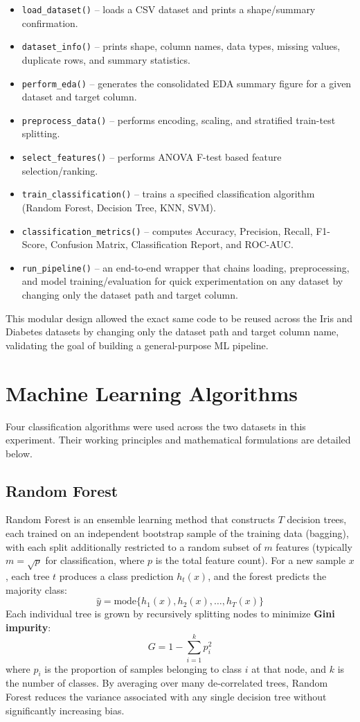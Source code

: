 \documentclass[12pt,a4paper]{article}
\begin{document}
\begin{itemize}
\item \texttt{load\_dataset()} -- loads a CSV dataset and prints a shape/summary confirmation.
\item \texttt{dataset\_info()} -- prints shape, column names, data types, missing values, duplicate rows, and summary statistics.
\item \texttt{perform\_eda()} -- generates the consolidated EDA summary figure for a given dataset and target column.
\item \texttt{preprocess\_data()} -- performs encoding, scaling, and stratified train-test splitting.
\item \texttt{select\_features()} -- performs ANOVA F-test based feature selection/ranking.
\item \texttt{train\_classification()} -- trains a specified classification algorithm (Random Forest, Decision Tree, KNN, SVM).
\item \texttt{classification\_metrics()} -- computes Accuracy, Precision, Recall, F1-Score, Confusion Matrix, Classification Report, and ROC-AUC.
\item \texttt{run\_pipeline()} -- an end-to-end wrapper that chains loading, preprocessing, and model training/evaluation for quick experimentation on any dataset by changing only the dataset path and target column.
\end{itemize}

This modular design allowed the exact same code to be reused across the Iris and Diabetes datasets by changing only the dataset path and target column name, validating the goal of building a general-purpose ML pipeline.

\section{Machine Learning Algorithms}

Four classification algorithms were used across the two datasets in this experiment. Their working principles and mathematical formulations are detailed below.

\subsection{Random Forest}

Random Forest is an ensemble learning method that constructs $T$ decision trees, each trained on an independent bootstrap sample of the training data (bagging), with each split additionally restricted to a random subset of $m$ features (typically $m = \sqrt{p}$ for classification, where $p$ is the total feature count). For a new sample $x$, each tree $t$ produces a class prediction $h_t(x)$, and the forest predicts the majority class:
\[
\hat{y} = \text{mode}\{h_1(x), h_2(x), \dots, h_T(x)\}
\]
Each individual tree is grown by recursively splitting nodes to minimize \textbf{Gini impurity}:
\[
G = 1 - \sum_{i=1}^{k} p_i^2
\]
where $p_i$ is the proportion of samples belonging to class $i$ at that node, and $k$ is the number of classes. By averaging over many de-correlated trees, Random Forest reduces the variance associated with any single decision tree without significantly increasing bias.
\end{document}
